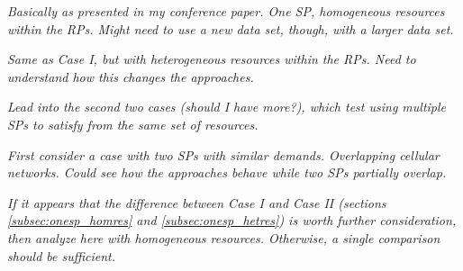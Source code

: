 \documentclass[12pt,dvipsnames]{report}
\begin{document}

\textit{Basically as presented in my conference paper.  One SP, homogeneous resources within the RPs.  Might need to use a new data set, though, with a larger data set.}


\textit{Same as Case I, but with heterogeneous resources within the RPs.  Need to understand how this changes the approaches.}


\textit{Lead into the second two cases (should I have more?), which test using multiple SPs to satisfy from the same set of resources.}


\textit{First consider a case with two SPs with similar demands.  Overlapping cellular networks.  Could see how the approaches behave while two SPs partially overlap.}


\textit{If it appears that the difference between Case I and Case II (sections \ref{subsec:onesp_homres} and \ref{subsec:onesp_hetres}) is worth further consideration, then analyze here with homogeneous resources.  Otherwise, a single comparison should be sufficient.}

\end{document}
